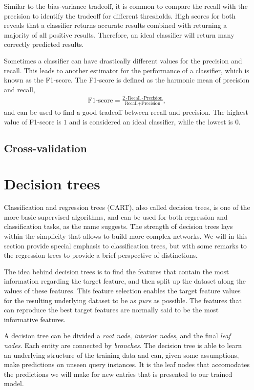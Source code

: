 Similar to the bias-variance tradeoff, it is common to compare the recall with the precision to identify the tradeoff for different thresholds. High scores for both reveals that a classifier returns accurate results combined with returning a majority of all positive results. Therefore, an ideal classifier will return many correctly predicted results.

Sometimes a classifier can have drastically different values for the precision and recall. This leads to another estimator for the performance of a classifier, which is known as the F1-score. The F1-score is defined as the harmonic mean of precision and recall,
\begin{align*}
\text{F1-score} = \frac{2\cdot \text{Recall} \cdot \text{Precision}}{\text{Recall} + \text{Precision}},
\end{align*}
and can be used to find a good tradeoff between recall and precision. The highest value of F1-score is $1$ and is considered an ideal classifier, while the lowest is $0$.

\subsection{Cross-validation}



\section{Decision trees}
Classification and regression trees (CART), also called decision trees, is one of the more basic supervised algorithms, and can be used for both regression and classification tasks, as the name suggests. The strength of decision trees lays within the simplicity that allows to build more complex networks. We will in this section provide special emphasis to classification trees, but with some remarks to the regression trees to provide a brief perspective of distinctions.

The idea behind decision trees is to find the features that contain the most information regarding the target feature, and then split up the dataset along the values of these features. This feature selection enables the target feature values for the resulting underlying dataset to be as \textit{pure} as possible. The features that can reproduce the best target features are normally said to be the most informative features.

A decision tree can be divided a \textit{root node}, \textit{interior nodes}, and the final \textit{leaf nodes}. Each entity are connected by \textit{branches}. The decision tree is able to learn an underlying structure of the training data and can, given some assumptions, make predictions on unseen query instances. It is the leaf nodes that accomodates the predictions we will make for new entries that is presented to our trained model.

